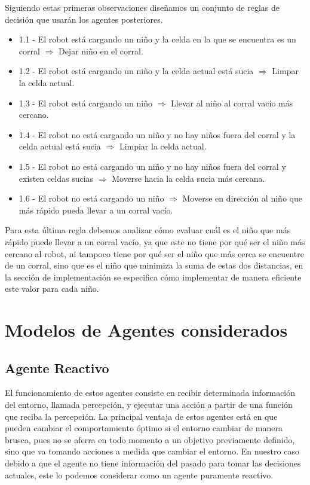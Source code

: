 \documentclass[]{article}
\begin{document}
\begin{flushleft}
	Siguiendo estas primeras observaciones diseñamos un conjunto de reglas de decisión que usarán los agentes posteriores.
\end{flushleft}

\begin{itemize}
	\item 1.1 - El robot está cargando un niño y la celda en la que se encuentra es un corral $\Rightarrow$ Dejar niño en el corral.
	\item 1.2 - El robot está cargando un niño y la celda actual está sucia $\Rightarrow$ Limpar la celda actual.
	\item 1.3 - El robot está cargando un niño $\Rightarrow$ Llevar al niño al corral vacío más cercano.
	\item 1.4 - El robot no está cargando un niño y no hay niños fuera del corral y la celda actual está sucia $\Rightarrow$ Limpiar la celda actual.
	\item 1.5 - El robot no está cargando un niño y no hay niños fuera del corral y existen celdas sucias $\Rightarrow$ Moverse hacia la celda sucia más cercana.
	\item 1.6 - El robot no está cargando un niño $\Rightarrow$ Moverse en dirección al niño que más rápido pueda llevar a un corral vacío.
\end{itemize}

Para esta última regla debemos analizar cómo evaluar cuál es el niño que más rápido puede llevar a un corral vacío, ya que este no tiene por qué ser el niño más cercano al robot, ni tampoco tiene por qué ser el niño que más cerca se encuentre de un corral, sino que es el niño que minimiza la suma de estas dos distancias, en la sección de implementación se especifica cómo implementar de manera eficiente este valor para cada niño. 

\section{Modelos de Agentes considerados}

\subsection{Agente Reactivo}

\begin{flushleft}
	El funcionamiento de estos agentes consiste en recibir determinada información del entorno, llamada percepción, y ejecutar una acción a partir de una función que reciba la percepción. La principal ventaja de estos agentes está en que pueden cambiar el comportamiento óptimo si el entorno cambiar de manera brusca, pues no se aferra en todo momento a un objetivo previamente definido, sino que va tomando acciones a medida que cambiar el entorno. En nuestro caso debido a que el agente no tiene información del pasado para tomar las decisiones actuales, este lo podemos considerar como un agente puramente reactivo.
\end{flushleft}
\end{document}

